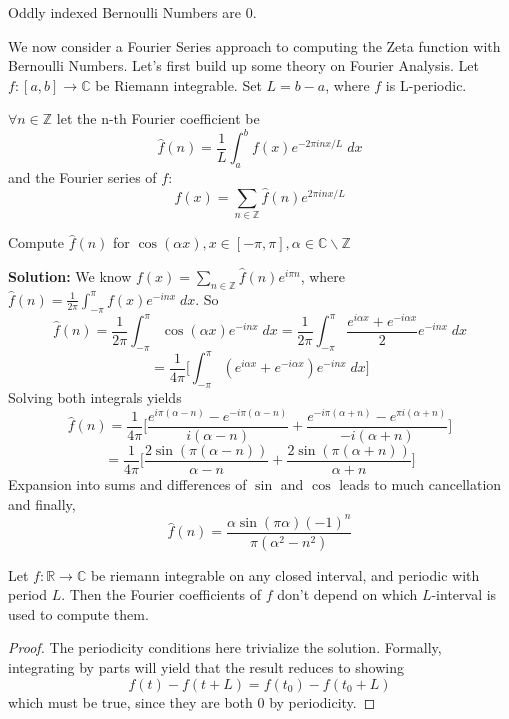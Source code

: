 \begin{corollary}
    Oddly indexed Bernoulli Numbers are 0.
\end{corollary}
We now consider a Fourier Series approach to computing the Zeta function with Bernoulli Numbers. Let's first build up some
theory on Fourier Analysis.
Let $f:[a,b]\rightarrow \mathbb{C}$ be Riemann integrable. Set $L=b-a$, where $f$ is L-periodic.
\begin{definition}
    $\forall n\in\mathbb{Z}$ let the n-th Fourier coefficient be 
    \[
        \hat{f}(n)=\frac{1}{L}\int_a^bf(x)e^{-2\pi inx/L}\; dx
    \]
    and the Fourier series of $f$:
    \[
        f(x)=\sum_{n\in\mathbb{Z}}\hat{f}(n)e^{2\pi inx/L}  
    \]
\end{definition}
\begin{example}
    Compute $\hat{f}(n)$ for $\cos(\alpha x), x\in [-\pi,\pi], \alpha\in\mathbb{C}\backslash\mathbb{Z}$
\end{example}
\textbf{Solution:} We know $f(x)=\sum_{n\in\mathbb{Z}}\hat{f}(n)e^{i\pi n}$,
where $\hat{f}(n)=\frac{1}{2\pi}\int_{-\pi}^{\pi}f(x)e^{-inx}\;dx$.
So 
\[
    \hat{f}(n)=\frac{1}{2\pi}\int_{-\pi}^{\pi}\cos(\alpha x)e^{-inx}\;dx
    =\frac{1}{2\pi}\int_{-\pi}^{\pi}\frac{e^{i\alpha x}+e^{-i\alpha x}}{2}e^{-inx}\; dx
    \]
    \[= \frac{1}{4\pi}\big[\int_{-\pi}^{\pi}(e^{i\alpha x}+e^{-i\alpha x})e^{-inx}\; dx\big]
\]
Solving both integrals yields 
\[
    \hat{f}(n) = \frac{1}{4\pi}\big[\frac{e^{i\pi(\alpha-n)}-e^{-i\pi(\alpha-n)}}{i(\alpha-n)}+
    \frac{e^{-i\pi(\alpha+n)}-e^{\pi i(\alpha+n)}}{-i(\alpha+n)}\big]
\]  
\[
    =\frac{1}{4\pi}\big[\frac{2\sin(\pi(\alpha-n))}{\alpha-n}+\frac{2\sin(\pi(\alpha+n))}{\alpha+n}\big]
\]
Expansion into sums and differences of $\sin$ and $\cos$ leads to much cancellation and finally,
\[
    \hat{f}(n)=\frac{\alpha \sin(\pi \alpha)(-1)^n}{\pi(\alpha^2-n^2)}
\]  
\begin{theorem}
    Let $f:\mathbb{R}\rightarrow \mathbb{C}$ be riemann integrable on any closed interval, and 
    periodic with period $L$. Then the Fourier coefficients of $f$ don't depend on which $L$-interval
    is used to compute them.
\end{theorem}
\begin{proof}
    The periodicity conditions here trivialize the solution. Formally, integrating by parts will
    yield that the result reduces to showing 
    \[
        f(t)-f(t+L)=f(t_0)-f(t_0+L)
    \]
    which must be true, since they are both $0$ by periodicity.

\end{proof}

